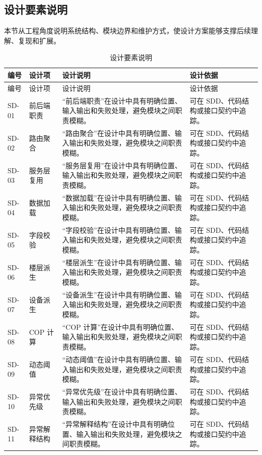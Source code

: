 \documentclass[12pt,a4paper]{ctexart}
\begin{document}
\subsection{设计要素说明}
本节从工程角度说明系统结构、模块边界和维护方式，使设计方案能够支撑后续理解、复现和扩展。
\begin{longtable}{L{1.7cm}L{3.2cm}L{6.4cm}L{4.0cm}}
\caption{设计要素说明}\\
\toprule
编号 & 设计项 & 设计说明 & 设计依据 \\
\midrule
\endfirsthead
\toprule
编号 & 设计项 & 设计说明 & 设计依据 \\
\midrule
\endhead
SD-01 & 前后端职责 & “前后端职责”在设计中具有明确位置、输入输出和失败处理，避免模块之间职责模糊。 & 可在 SDD、代码结构或接口契约中追踪。 \\
SD-02 & 路由聚合 & “路由聚合”在设计中具有明确位置、输入输出和失败处理，避免模块之间职责模糊。 & 可在 SDD、代码结构或接口契约中追踪。 \\
SD-03 & 服务层复用 & “服务层复用”在设计中具有明确位置、输入输出和失败处理，避免模块之间职责模糊。 & 可在 SDD、代码结构或接口契约中追踪。 \\
SD-04 & 数据加载 & “数据加载”在设计中具有明确位置、输入输出和失败处理，避免模块之间职责模糊。 & 可在 SDD、代码结构或接口契约中追踪。 \\
SD-05 & 字段校验 & “字段校验”在设计中具有明确位置、输入输出和失败处理，避免模块之间职责模糊。 & 可在 SDD、代码结构或接口契约中追踪。 \\
SD-06 & 楼层派生 & “楼层派生”在设计中具有明确位置、输入输出和失败处理，避免模块之间职责模糊。 & 可在 SDD、代码结构或接口契约中追踪。 \\
SD-07 & 设备派生 & “设备派生”在设计中具有明确位置、输入输出和失败处理，避免模块之间职责模糊。 & 可在 SDD、代码结构或接口契约中追踪。 \\
SD-08 & COP 计算 & “COP 计算”在设计中具有明确位置、输入输出和失败处理，避免模块之间职责模糊。 & 可在 SDD、代码结构或接口契约中追踪。 \\
SD-09 & 动态阈值 & “动态阈值”在设计中具有明确位置、输入输出和失败处理，避免模块之间职责模糊。 & 可在 SDD、代码结构或接口契约中追踪。 \\
SD-10 & 异常优先级 & “异常优先级”在设计中具有明确位置、输入输出和失败处理，避免模块之间职责模糊。 & 可在 SDD、代码结构或接口契约中追踪。 \\
SD-11 & 异常解释结构 & “异常解释结构”在设计中具有明确位置、输入输出和失败处理，避免模块之间职责模糊。 & 可在 SDD、代码结构或接口契约中追踪。 \\

\end{longtable}
\end{document}
